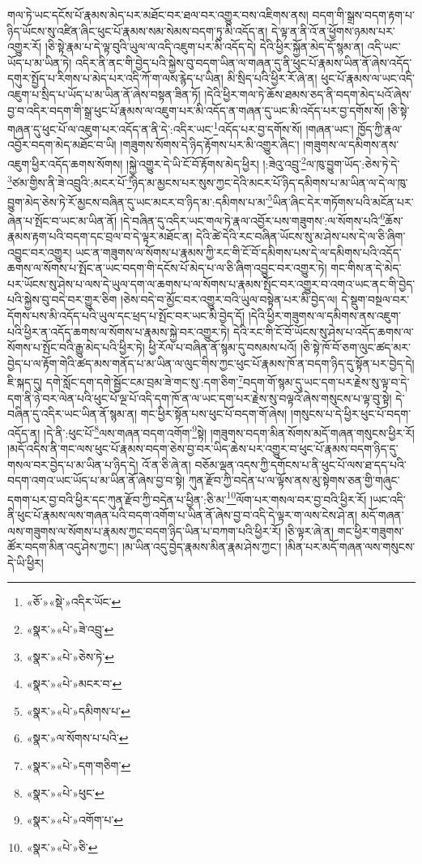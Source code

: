 གལ་ཏེ་ཡང་དངོས་པོ་རྣམས་མེད་པར་མཐོང་བར་ཐལ་བར་འགྱུར་བས་འཇིགས་ནས། བདག་གི་སྒྲས་བདག་རྟག་པ་ཉིད་ཡོངས་སུ་འཛིན་ཞིང་ཕུང་པོ་རྣམས་སམ་སེམས་བདག་ཏུ་མི་འདོད་ན། དེ་ལྟ་ན་ནི་འོ་ན་ཕྱོགས་ཉམས་པར་འགྱུར་རོ། །ཅི་སྟེ་རྣམ་པ་དེ་ལྟ་བུའི་ཡུལ་ལ་འདི་འཇུག་པར་མི་འདོད་དེ། དེའི་ཕྱིར་སྐྱོན་མེད་དོ་སྙམ་ན། འདི་ཡང་ཡོད་པ་མ་ཡིན་ཏེ། འདིར་ནི་ནང་གི་བྱེད་པའི་སྐྱེས་བུ་བདག་ཡིན་ལ་གཞན་དུ་ནི་ཕུང་པོ་རྣམས་ཡིན་ནོ་ཞེས་འདོད་དགུར་སྤྱོད་པ་རིགས་པ་མེད་པར་འདི་ཀོ་ག་ལས་རྙེད་པ་ཡིན། མི་སྲིད་པའི་ཕྱིར་རོ་ཞེ་ན། ཕུང་པོ་རྣམས་ལ་ཡང་འདི་འཇུག་པ་སྲིད་པ་ཡོད་པ་མ་ཡིན་ནོ་ཞེས་བསྟན་ཟིན་ཏོ། །དེའི་ཕྱིར་གལ་ཏེ་ཆོས་ཐམས་ཅད་ནི་བདག་མེད་པའོ་ཞེས་བྱ་བ་འདིར་བདག་གི་སྒྲ་ཕུང་པོ་རྣམས་ལ་འཇུག་པར་མི་འདོད་ན་གཞན་དུ་ཡང་མི་འདོད་པར་བྱ་དགོས་སོ། །ཅི་སྟེ་གཞན་དུ་ཕུང་པོ་ལ་འཇུག་པར་འདོད་ན་ནི་དེ་:འདིར་ཡང་\footnote{«ཅོ་»«སྡེ་»འདིར་ཡོང་}འདོད་པར་བྱ་དགོས་སོ། །གཞན་ཡང་། ཁྱོད་ཀྱི་རྣལ་འབྱོར་བདག་མེད་མཐོང་བ་ཡི། །གཟུགས་སོགས་དེ་ཉིད་རྟོགས་པར་མི་འགྱུར་ཞིང་། །གཟུགས་ལ་དམིགས་ནས་འཇུག་ཕྱིར་འདོད་ཆགས་སོགས། །སྐྱེ་འགྱུར་དེ་ཡི་ངོ་བོ་རྟོགས་མེད་ཕྱིར། །:ཟེའུ་འབྲུ་\footnote{«སྣར་»«པེ་»ཟེ་འབྲུ་}ལ་ཁུ་བྱུག་ཡོད་:ཅེས་ཏེ་དེ་\footnote{«སྣར་»«པེ་»ཅེས་ཏེ་}ཙམ་གྱིས་ནི་ཟེ་འབྲུའི་:མངར་པོ་\footnote{«སྣར་»«པེ་»མངར་བ་}ཉིད་མ་མྱངས་པར་སུས་ཀྱང་དེའི་མངར་པོ་ཉིད་དམིགས་པ་མ་ཡིན་ལ་དེ་ལ་ཁུ་བྱུག་མེད་ཅེས་ཏེ་རོ་མྱངས་བཞིན་དུ་ཡང་མངར་བ་ཉིད་མ་:དམིགས་པ་མ་\footnote{«སྣར་»«པེ་»དམིགས་པ་}ཡིན་ཞིང་དེར་གཏོགས་པའི་མངོན་པར་ཞེན་པ་སྤོང་བ་ཡང་མ་ཡིན་ནོ། །དེ་བཞིན་དུ་འདིར་ཡང་གལ་ཏེ་རྣལ་འབྱོར་པས་གཟུགས་:ལ་སོགས་པའི་\footnote{«སྣར་»ལ་སོགས་པ་པའི་}ཆོས་རྣམས་རྟག་པའི་བདག་དང་བྲལ་བ་དེ་ལྟར་མཐོང་ན། དེའི་ཚེ་དེའི་རང་བཞིན་ཡོངས་སུ་མ་ཤེས་པས་དེ་ལ་ཅི་ཞིག་འབྱུང་བར་འགྱུར། ཡང་ན་གཟུགས་ལ་སོགས་པ་རྣམས་ཀྱི་རང་གི་ངོ་བོ་དམིགས་པས་དེ་ལ་དམིགས་པའི་འདོད་ཆགས་ལ་སོགས་པ་སྤོང་ན་ཡང་བདག་གི་དངོས་པོ་མེད་པ་ལ་ཅི་ཞིག་འབྱུང་བར་འགྱུར་ཏེ། གང་གིས་ན་དེ་མེད་པར་ཡོངས་སུ་ཤེས་པ་ལས་དེ་ཡུལ་དག་ལ་ཆགས་པ་ལ་སོགས་པ་རྣམས་སྤོང་བར་འགྱུར་བ་འགའ་ཡང་ནང་གི་བྱེད་པའི་སྐྱེས་བུ་བདེ་བར་གྱུར་ཅིག །ཅེས་བདེ་བ་མྱོང་བར་འགྱུར་བའི་ཡུལ་བསྟེན་པར་མི་བྱེད་ལ། དེ་སྡུག་བསྔལ་བར་དོགས་པས་མི་འདོད་པའི་ཡུལ་དང་ཕྲད་པ་སྤོང་བར་ཡང་མི་བྱེད་དོ། །དེའི་ཕྱིར་གཟུགས་ལ་དམིགས་ནས་འཇུག་པའི་ཕྱིར་ན་འདོད་ཆགས་ལ་སོགས་པ་རྣམས་སྐྱེ་བར་འགྱུར་ཏེ། དེའི་རང་གི་ངོ་བོ་ཡོངས་སུ་ཤེས་པ་འདོད་ཆགས་ལ་སོགས་པ་སྤོང་བའི་རྒྱུ་མེད་པའི་ཕྱིར་ཏེ། ཕྱི་རོལ་པ་བཞིན་ནོ་སྙམ་དུ་བསམས་པའོ། །ཅི་སྟེ་ཁོ་བོ་ཅག་ལུང་ཚད་མར་བྱེད་པ་ལ་རྟོག་གེའི་ཚད་མས་གནོད་པ་མ་ཡིན་ལ་ལུང་གིས་ཀྱང་ཕུང་པོ་རྣམས་ཁོ་ན་བདག་ཉིད་དུ་སྟོན་པར་བྱེད་དེ། ཇི་སྐད་དུ། དགེ་སློང་དག་དགེ་སྦྱོང་ངམ་བྲམ་ཟེ་གང་སུ་:དག་ཅིག་\footnote{«སྣར་»«པེ་»དག་གཅིག་}བདག་གོ་སྙམ་དུ་ཡང་དག་པར་རྗེས་སུ་ལྟ་བ་དེ་དག་ནི་ཉེ་བར་ལེན་པའི་ཕུང་པོ་ལྔ་པོ་འདི་དག་ཁོ་ན་ལ་ཡང་དག་པར་རྗེས་སུ་བལྟའོ་ཞེས་གསུངས་པ་ལྟ་བུ་སྟེ། དེ་བཞིན་དུ་འདིར་ཡང་ཡིན་ནོ་སྙམ་ན། གང་ཕྱིར་སྟོན་པས་ཕུང་པོ་བདག་གོ་ཞེས། །གསུངས་པ་དེ་ཕྱིར་ཕུང་པོ་བདག་འདོད་ན། །དེ་ནི་:ཕུང་པོ་\footnote{«སྣར་»«པེ་»ཕུང་}ལས་གཞན་བདག་འགོག་\footnote{«སྣར་»«པེ་»འགོག་པ་}སྟེ། །གཟུགས་བདག་མིན་སོགས་མདོ་གཞན་གསུངས་ཕྱིར་རོ། །མདོ་འདིས་ནི་གང་ལས་ཕུང་པོ་རྣམས་བདག་ཅེས་བྱ་བར་ཡིད་ཆེས་པར་འགྱུར་བ་ཕུང་པོ་རྣམས་བདག་ཉིད་དུ་གསལ་བར་བྱེད་པ་མ་ཡིན་པ་ཉིད་དེ། འོ་ན་ཅི་ཞེ་ན། བཅོམ་ལྡན་འདས་ཀྱི་དགོངས་པ་ནི་ཕུང་པོ་ལས་ཐ་དད་པའི་བདག་འགའ་ཡང་ཡོད་པ་མ་ཡིན་ནོ་ཞེས་བྱ་བ་སྟེ། ཀུན་རྫོབ་ཀྱི་བདེན་པ་ལ་ལྟོས་ནས་མུ་སྟེགས་ཅན་གྱི་གཞུང་དགག་པར་བྱ་བའི་ཕྱིར་དང་ཀུན་རྫོབ་ཀྱི་བདེན་པ་ཕྱིན་:ཅི་མ་\footnote{«སྣར་»«པེ་»ཅི་}ལོག་པར་གསལ་བར་བྱ་བའི་ཕྱིར་རོ། །ཡང་འདི་ནི་ཕུང་པོ་རྣམས་ལས་གཞན་པའི་བདག་འགོག་པ་ཡིན་ནོ་ཞེས་བྱ་བ་འདི་དེ་ལྟར་ག་ལས་ངེས་ཤེ་ན། མདོ་གཞན་ལས་གཟུགས་ལ་སོགས་པ་རྣམས་ཀྱང་བདག་ཉིད་ཡིན་པ་བཀག་པའི་ཕྱིར་རོ། །ཅི་ལྟར་ཞེ་ན། གང་ཕྱིར་གཟུགས་ཚོར་བདག་མིན་འདུ་ཤེས་ཀྱང་། །མ་ཡིན་འདུ་བྱེད་རྣམས་མིན་རྣམ་ཤེས་ཀྱང་། །མིན་པར་མདོ་གཞན་ལས་གསུངས་དེ་ཡི་ཕྱིར། 
